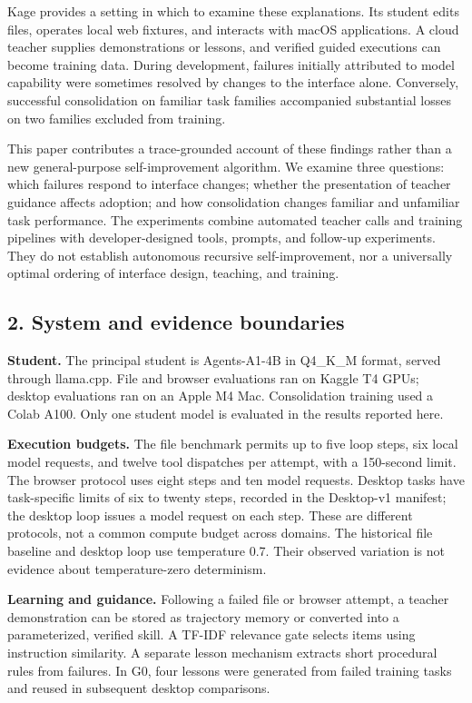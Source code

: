 \documentclass[
  10pt,
]{article}
\begin{document}
Kage provides a setting in which to examine these explanations. Its
student edits files, operates local web fixtures, and interacts with
macOS applications. A cloud teacher supplies demonstrations or lessons,
and verified guided executions can become training data. During
development, failures initially attributed to model capability were
sometimes resolved by changes to the interface alone. Conversely,
successful consolidation on familiar task families accompanied
substantial losses on two families excluded from training.

This paper contributes a trace-grounded account of these findings rather
than a new general-purpose self-improvement algorithm. We examine three
questions: which failures respond to interface changes; whether the
presentation of teacher guidance affects adoption; and how consolidation
changes familiar and unfamiliar task performance. The experiments
combine automated teacher calls and training pipelines with
developer-designed tools, prompts, and follow-up experiments. They do
not establish autonomous recursive self-improvement, nor a universally
optimal ordering of interface design, teaching, and training.

\subsection{2. System and evidence
boundaries}\label{system-and-evidence-boundaries}

\textbf{Student.} The principal student is Agents-A1-4B in Q4\_K\_M
format, served through llama.cpp. File and browser evaluations ran on
Kaggle T4 GPUs; desktop evaluations ran on an Apple M4 Mac.
Consolidation training used a Colab A100. Only one student model is
evaluated in the results reported here.

\textbf{Execution budgets.} The file benchmark permits up to five loop
steps, six local model requests, and twelve tool dispatches per attempt,
with a 150-second limit. The browser protocol uses eight steps and ten
model requests. Desktop tasks have task-specific limits of six to twenty
steps, recorded in the Desktop-v1 manifest; the desktop loop issues a
model request on each step. These are different protocols, not a common
compute budget across domains. The historical file baseline and desktop
loop use temperature 0.7. Their observed variation is not evidence about
temperature-zero determinism.

\textbf{Learning and guidance.} Following a failed file or browser
attempt, a teacher demonstration can be stored as trajectory memory or
converted into a parameterized, verified skill. A TF-IDF relevance gate
selects items using instruction similarity. A separate lesson mechanism
extracts short procedural rules from failures. In G0, four lessons were
generated from failed training tasks and reused in subsequent desktop
comparisons.
\end{document}
